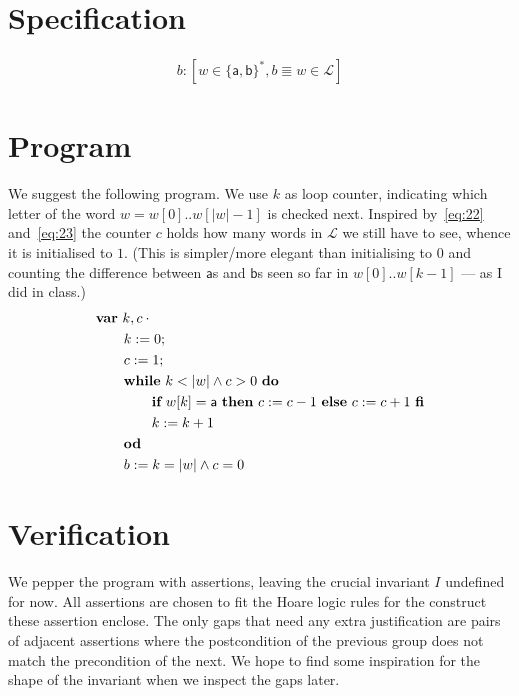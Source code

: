 \documentclass[a4paper]{scrartcl}
\newcommand{\ah}{\mathsf{a}}
\newcommand{\be}{\mathsf{b}}
\newcommand{\VAR}{\pPkey{var}}
\def\L{\mathcal{L}}
\begin{document}
\section{Specification}
\label{sec:task-1}


\begin{gather}
  b:[w\in\{\ah,\be\}^*, b\Equiv w\in \L]
\end{gather}

\section{Program}
\label{sec:program}

We suggest the following program. We use $k$ as loop counter,
indicating which letter of the word $w =w[0]..w[|w|-1]$ is checked
next. Inspired by~\eqref{eq:22} and~\eqref{eq:23} the counter $c$
holds how many words in $\L$ we still have to see, whence it is
initialised to $1$. (This is simpler/more elegant than initialising to
$0$ and counting the difference between $\ah$s and $\be$s seen so far
in $w[0]..w[k-1]$ --- as I did in class.)
\begin{align*}
  & \VAR~k,c\cdot{}\\
  & \qquad k\Ass 0;\\
  & \qquad c\Ass 1;\\
  & \qquad \WHILE~k < |w|\And c > 0~\DO\\
  & \qquad \qquad \IF~w[k] = \ah~\THEN~c\Ass c-1~\ELSE~c\Ass c+1~\FI\\
  & \qquad \qquad k\Ass k+1\\
  & \qquad \OD\\
  & \qquad b\Ass k=|w|\And c = 0
\end{align*}

\section{Verification}
\label{sec:verification}

We pepper the program with assertions, leaving the crucial invariant
$I$ undefined for now. All assertions are chosen to fit the Hoare
logic rules for the construct these assertion enclose. The only gaps
that need any extra justification are pairs of adjacent assertions
where the postcondition of the previous group does not match the
precondition of the next. We hope to find some inspiration for the
shape of the invariant when we inspect the gaps later.
\end{document}
